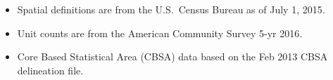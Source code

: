\begin{itemize}
\item Spatial definitions are from the U.S.~Census Bureau as of July 1, 2015.
\item Unit counts are from the American Community Survey 5-yr 2016.
\item Core Based Statistical Area (CBSA) data based on the Feb 2013 CBSA delineation file.
\end{itemize}
